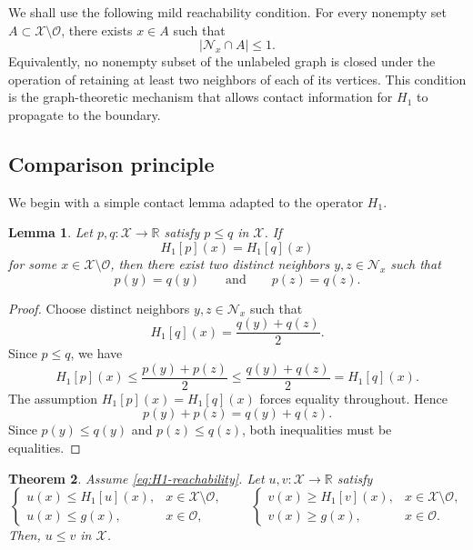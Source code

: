 \documentclass[reqno,11pt]{amsart}
\numberwithin{equation}{section}
\newtheorem{theorem}{Theorem}[section]
\newtheorem{lemma}[theorem]{Lemma}
\theoremstyle{definition}
\theoremstyle{remark}
\begin{document}
We shall use the following mild reachability condition. For every nonemp\-ty set \(A\subset \mathcal X\setminus\mathcal O\), there exists \(x\in A\) such that
\begin{equation}\label{eq:H1-reachability}
    |\mathcal N_x\cap A|\le 1.
\end{equation}
Equivalently, no nonempty subset of the unlabeled graph is closed under the operation of retaining at least two neighbors of each of its vertices. This condition is the graph-theoretic mechanism that allows contact information for \(H_1\) to propagate to the boundary.

\subsection{Comparison principle}

We begin with a simple contact lemma adap\-ted to the operator \(H_1\).

\begin{lemma}\label{lem:H1-contact-propagation}
Let \(p,q\colon\mathcal X\to\mathbb R\) satisfy \(p\le q\) in \(\mathcal X\). If
\[
    H_1[p](x)=H_1[q](x)
\]
for some \(x\in\mathcal X\setminus\mathcal O\), then there exist two distinct neighbors \(y,z\in\mathcal N_x\) such that
\[
    p(y)=q(y)
    \qquad\text{and}\qquad
    p(z)=q(z).
\]
\end{lemma}

\begin{proof}
Choose distinct neighbors \(y,z\in\mathcal N_x\) such that
\[
    H_1[q](x)=\frac{q(y)+q(z)}{2}.
\]
Since \(p\le q\), we have
\[
    H_1[p](x)
    \le
    \frac{p(y)+p(z)}{2}
    \le
    \frac{q(y)+q(z)}{2}
    =
    H_1[q](x).
\]
The assumption \(H_1[p](x)=H_1[q](x)\) forces equality throughout. Hence
\[
    p(y)+p(z)=q(y)+q(z).
\]
Since \(p(y)\le q(y)\) and \(p(z)\le q(z)\), both inequalities must be equalities.
\end{proof}

\begin{theorem}\label{thm:homo-comparison-principle}
Assume \eqref{eq:H1-reachability}. Let \(u,v\colon\mathcal X\to\mathbb R\) satisfy
\[
    \begin{cases}
        u(x)\le H_1[u](x),
        & x\in\mathcal X\setminus\mathcal O,\\
        u(x)\le g(x),
        & x\in\mathcal O,
    \end{cases}
    \qquad
    \begin{cases}
        v(x)\ge H_1[v](x),
        & x\in\mathcal X\setminus\mathcal O,\\
        v(x)\ge g(x),
        & x\in\mathcal O.
    \end{cases}
\]
Then, \(u\le v\) in \(\mathcal X\).
\end{theorem}
\end{document}
